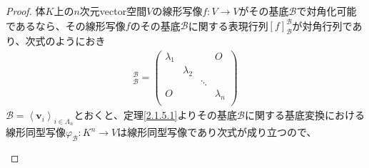 \documentclass[dvipdfmx]{jsarticle}
\begin{document}
\begin{proof}
体$K$上の$n$次元vector空間$V$の線形写像$f:V \rightarrow V$がその基底$\mathcal{B}$で対角化可能であるなら、その線形写像$f$のその基底$\mathcal{B}$に関する表現行列$[ f]_{\mathcal{B}}^{\mathcal{B}}$が対角行列であり、次式のようにおき
\begin{align*}
[ f]_{\mathcal{B}}^{\mathcal{B}} = \begin{pmatrix}
\lambda_{1} & \  & \  & O \\
\  & \lambda_{2} & \  & \  \\
\  & \  & \ddots & \  \\
O & \  & \  & \lambda_{n} \\
\end{pmatrix}
\end{align*}
$\mathcal{B} =\left\langle \mathbf{v}_{i} \right\rangle_{i \in \varLambda_{n}}$とおくと、定理\ref{2.1.5.1}よりその基底$\mathcal{B}$に関する基底変換における線形同型写像$\varphi_{\mathcal{B}}:K^{n} \rightarrow V$は線形同型写像であり次式が成り立つので、
\begin{center}
\end{center}
\end{proof}
\end{document}
